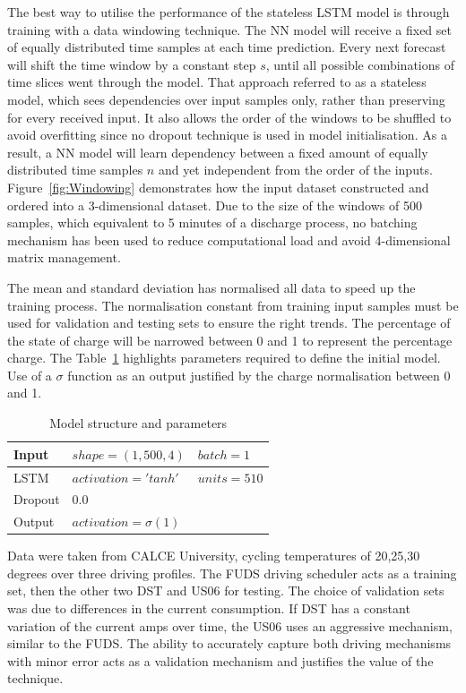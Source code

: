 %
%
The best way to utilise the performance of the stateless LSTM model is through training with a data windowing technique.
The NN model will receive a fixed set of equally distributed time samples at each time prediction.
Every next forecast will shift the time window by a constant step $s$, until all possible combinations of time slices went through the model.
That approach referred to as a stateless model, which sees dependencies over input samples only, rather than preserving for every received input.
It also allows the order of the windows to be shuffled to avoid overfitting since no dropout technique is used in model initialisation.
As a result, a NN model will learn dependency between a fixed amount of equally distributed time samples $n$ and yet independent from the order of the inputs.
Figure~\ref{fig:Windowing} demonstrates how the input dataset constructed and ordered into a 3-dimensional dataset.
Due to the size of the windows of 500 samples, which equivalent to 5 minutes of a discharge process, no batching mechanism has been used to reduce computational load and avoid 4-dimensional matrix management.


%
%
The mean and standard deviation has normalised all data to speed up the training process.
The normalisation constant from training input samples must be used for validation and testing sets to ensure the right trends.
The percentage of the state of charge will be narrowed between 0 and 1 to represent the percentage charge.
The Table~\ref{tab:params} highlights parameters required to define the initial model.
Use of a $\sigma$ function as an output justified by the charge normalisation between 0 and 1.
\begin{table}[ht]
    \centering
    \caption{Model structure and parameters}
    \label{tab:params}
    \begin{tabular}{ p{3.0cm} p{3.5cm} p{2.5cm}   }
        \hline
        Input     & $shape= \left( 1,500,4 \right)$ & $batch=1 $  \\
        \hline
        LSTM      & $activation= 'tanh'$ & $units=510$  \\
        \hline
        Dropout   & $0.0$ &   \\
        \hline
        Output    & $activation= \sigma\left(1\right)$ &   \\
        \hline
    \end{tabular}
\end{table}

%
%
Data were taken from CALCE University, cycling temperatures of 20,25,30 degrees over three driving profiles.
The FUDS driving scheduler acts as a training set, then the other two DST and US06 for testing.
The choice of validation sets was due to differences in the current consumption.
If DST has a constant variation of the current amps over time, the US06 uses an aggressive mechanism, similar to the FUDS.
The ability to accurately capture both driving mechanisms with minor error acts as a validation mechanism and justifies the value of the technique.

